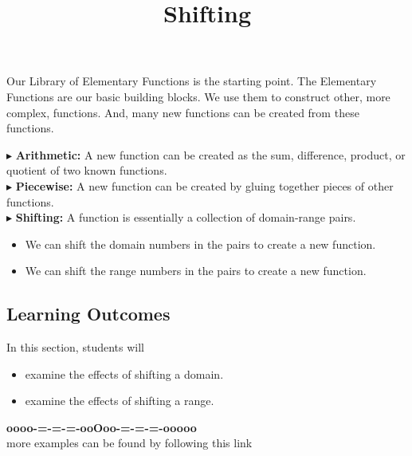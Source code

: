\documentclass{ximera}
\title{Shifting}
\begin{document}
\begin{abstract}
\end{abstract}
\maketitle



Our Library of Elementary Functions is the starting point.  The Elementary Functions are our basic building blocks.  We use them to construct other, more complex, functions.  And, many new functions can be created from these functions.


$\blacktriangleright$ \textbf{Arithmetic:} A new function can be created as the sum, difference, product, or quotient of two known functions. \\


$\blacktriangleright$ \textbf{Piecewise:} A new function can be created by gluing together pieces of other functions.  \\


$\blacktriangleright$ \textbf{Shifting:}  A function is essentially a collection of domain-range pairs.  


\begin{itemize}
\item We can shift the domain numbers in the pairs to create a new function.
\item We can shift the range numbers in the pairs to create a new function.
\end{itemize}




\subsection*{Learning Outcomes}


\begin{sectionOutcomes}
In this section, students will 

\begin{itemize}
\item examine the effects of shifting a domain.
\item examine the effects of shifting a range.
\end{itemize}
\end{sectionOutcomes}











\begin{center}
\textbf{\textcolor{green!50!black}{oooo-=-=-=-ooOoo-=-=-=-ooooo}} \\

more examples can be found by following this link\\ 

\end{center}
\end{document}

